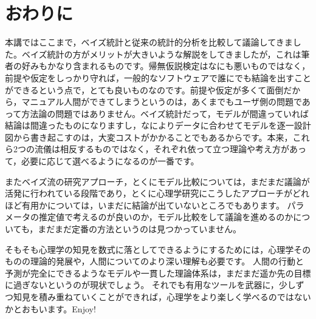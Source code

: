 \documentclass{ltjsbook}
\begin{document}
\section{おわりに}
本講ではここまで，ベイズ統計と従来の統計的分析を比較して議論してきました。ベイズ統計の方がメリットが大きいような解説をしてきましたが，これは筆者の好みもかなり含まれるものです。帰無仮説検定はなにも悪いものではなく，前提や仮定をしっかり守れば，一般的なソフトウェアで誰にでも結論を出すことができるという点で，とても良いものなのです。前提や仮定が多くて面倒だから，マニュアル人間ができてしまうというのは，あくまでもユーザ側の問題であって方法論の問題ではありません。ベイズ統計だって，モデルが間違っていれば結論は間違ったものになりますし，なによりデータに合わせてモデルを逐一設計図から書き起こすのは，大変コストがかかることでもあるからです。本来，これら2つの流儀は相反するものではなく，それぞれ依って立つ理論や考え方があって，必要に応じて選べるようになるのが一番です。

またベイズ流の研究アプローチ，とくにモデル比較については，まだまだ議論が活発に行われている段階であり，とくに心理学研究にこうしたアプローチがどれほど有用かについては，いまだに結論が出ていないところでもあります。
パラメータの推定値で考えるのが良いのか，モデル比較をして議論を進めるのかについても，まだまだ定番の方法というのは見つかっていません。

そもそも心理学の知見を数式に落としてできるようにするためには，心理学そのものの理論的発展や，人間についてのより深い理解も必要です。
人間の行動と予測が完全にできるようなモデルや一貫した理論体系は，まだまだ遥か先の目標に過ぎないというのが現状でしょう。
それでも有用なツールを武器に，少しずつ知見を積み重ねていくことができれば，心理学をより楽しく学べるのではないかとおもいます。Enjoy!
\end{document}
